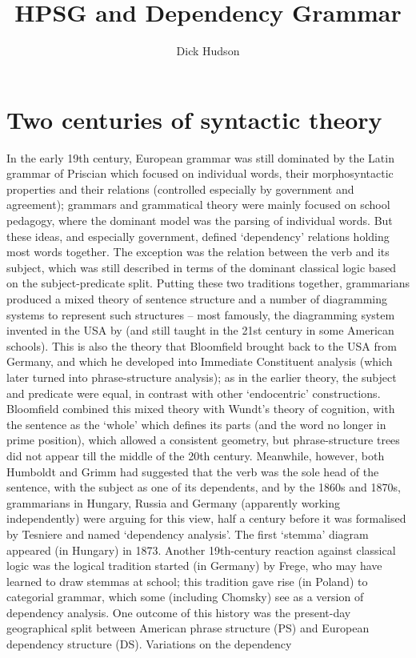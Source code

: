 \documentclass[output=paper]{langsci/langscibook}
\author{Dick Hudson\affiliation{London}}
\title{HPSG and Dependency Grammar}
\begin{document}
\section{Two centuries of syntactic theory}

In the early 19th century, European grammar was still dominated by the Latin grammar of Priscian
which focused on individual words, their morphosyntactic properties and their relations (controlled
especially by government and agreement); grammars and grammatical theory were mainly focused on
school pedagogy, where the dominant model was the parsing of individual words. But these ideas, and
especially government, defined ‘dependency’ relations holding most words together. The exception was
the relation between the verb and its subject, which was still described in terms of the dominant
classical logic based on the subject-predicate split. Putting these two traditions together,
grammarians produced a mixed theory of sentence structure and a number of diagramming systems to
represent such structures – most famously, the diagramming system invented in the USA by \citet{RK1877a} (and still taught in the 21st century in some American schools). This is also the theory
that Bloomfield brought back to the USA from Germany, and which he developed into Immediate
Constituent analysis (which later turned into phrase-structure analysis); as in the earlier theory,
the subject and predicate were equal, in contrast with other ‘endocentric’ constructions. Bloomfield
combined this mixed theory with Wundt’s theory of cognition, with the sentence as the ‘whole’ which
defines its parts (and the word no longer in prime position), which allowed a consistent geometry,
but phrase-structure trees did not appear till the middle of the 20th century.  Meanwhile, however,
both Humboldt and Grimm had suggested that the verb was the sole head of the sentence, with the
subject as one of its dependents, and by the 1860s and 1870s, grammarians in Hungary, Russia and
Germany (apparently working independently) were arguing for this view, half a century before it was
formalised by Tesniere and named ‘dependency analysis’. The first ‘stemma’ diagram appeared (in
Hungary) in 1873.  Another 19th-century reaction against classical logic was the logical tradition
started (in Germany) by Frege, who may have learned to draw stemmas at school; this tradition gave
rise (in Poland) to categorial grammar, which some (including Chomsky) see as a version of
dependency analysis.  One outcome of this history was the present-day geographical split between
American phrase structure (PS) and European dependency structure (DS).  Variations on the dependency
\end{document}
